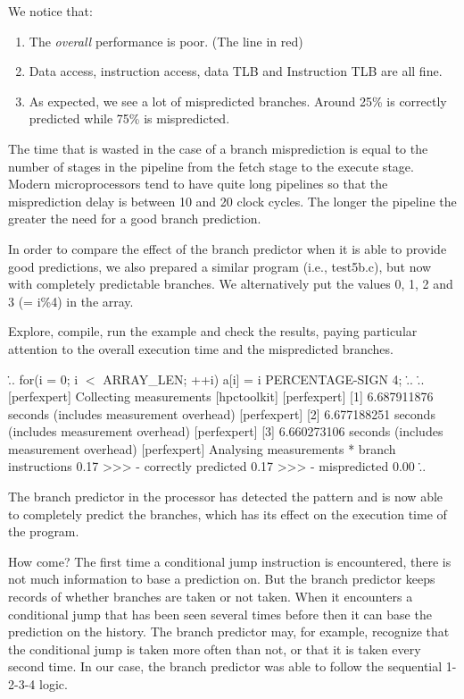 We notice that:

\begin{enumerate}
  \item  The \emph{overall} performance is poor. (The line in red)
  \item  Data access, instruction access, data TLB and Instruction TLB are all fine.
  \item  As expected, we see a lot of mispredicted branches. Around 25\% is correctly predicted while 75\% is mispredicted.
\end{enumerate}

The time that is wasted in the case of a branch misprediction is equal to the number of stages in the pipeline from the fetch stage to the execute stage. Modern microprocessors tend to have quite long pipelines so that the misprediction delay is between 10 and 20 clock cycles. The longer the pipeline the greater the need for a good branch prediction.

In order to compare the effect of the branch predictor when it is able to provide good predictions, we also prepared a similar program (i.e., test5b.c), but now with completely predictable branches. We alternatively put the values 0, 1, 2 and 3 (= i\%4) in the array.

Explore, compile, run the example and check the results, paying particular attention to the overall execution time and the mispredicted branches.

\begin{prompt}
\...
 for(i = 0; i $<$ ARRAY\_LEN; ++i)
   a[i] = i PERCENTAGE-SIGN 4;
\...
\...
[perfexpert] Collecting measurements [hpctoolkit]
[perfexpert]    [1] 6.687911876 seconds (includes measurement overhead)
[perfexpert]    [2] 6.677188251 seconds (includes measurement overhead)
[perfexpert]    [3] 6.660273106 seconds (includes measurement overhead)
[perfexpert] Analysing measurements
* branch instructions   0.17 >>>
 - correctly predicted  0.17 >>>
 - mispredicted         0.00
\...
\end{prompt}

The branch predictor in the processor has detected the pattern and is now able to completely predict the branches, which has its effect on the execution time of the program.

How come? The first time a conditional jump instruction is encountered, there is not much information to base a prediction on. But the branch predictor keeps records of whether branches are taken or not taken. When it encounters a conditional jump that has been seen several times before then it can base the prediction on the history. The branch predictor may, for example, recognize that the conditional jump is taken more often than not, or that it is taken every second time. In our case, the branch predictor was able to follow the sequential 1-2-3-4 logic.

